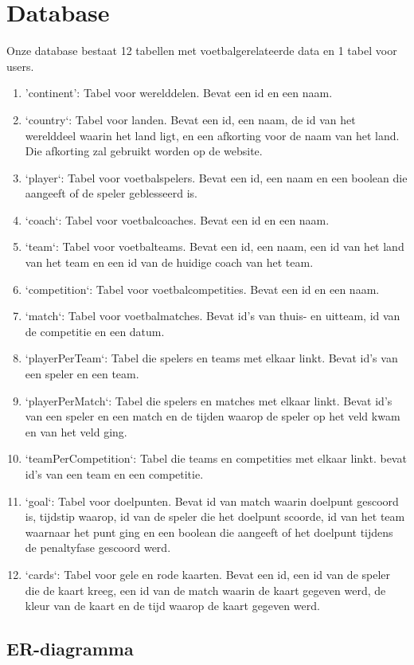 \documentclass[11pt, a4paper]{article}
\begin{document}
\section{Database}
Onze database bestaat 12 tabellen met voetbalgerelateerde data en 1 tabel voor users.
\begin{enumerate}
\item 'continent': Tabel voor werelddelen. Bevat een id en een naam.
\item `country`: Tabel voor landen. Bevat een id, een naam, de id van het werelddeel waarin het land ligt, en een afkorting voor de naam van het land. Die afkorting zal gebruikt worden op de website.
\item `player`: Tabel voor voetbalspelers. Bevat een id, een naam en een boolean die aangeeft of de speler geblesseerd is.
\item `coach`: Tabel voor voetbalcoaches. Bevat een id en een naam.
\item `team`: Tabel voor voetbalteams. Bevat een id, een naam, een id van het land van het team en een id van de huidige coach van het team.
\item `competition`: Tabel voor voetbalcompetities. Bevat een id en een naam.
\item `match`: Tabel voor voetbalmatches. Bevat id's van thuis- en uitteam, id van de competitie en een datum.
\item `playerPerTeam`: Tabel die spelers en teams met elkaar linkt. Bevat id's van een speler en een team.
\item `playerPerMatch`: Tabel die spelers en matches met elkaar linkt. Bevat id's van een speler en een match en de tijden waarop de speler op het veld kwam en van het veld ging.
\item `teamPerCompetition`: Tabel die teams en competities met elkaar linkt. bevat id's van een team en een competitie.
\item `goal`: Tabel voor doelpunten. Bevat id van match waarin doelpunt gescoord is, tijdstip waarop, id van de speler die het doelpunt scoorde, id van het team waarnaar het punt ging en een boolean die aangeeft of het doelpunt tijdens de penaltyfase gescoord werd.
\item `cards`: Tabel voor gele en rode kaarten. Bevat een id,	een id van de speler die de kaart kreeg, een id van de match waarin de kaart gegeven werd, de kleur van de kaart en de tijd waarop de kaart gegeven werd.
\end{enumerate}

\subsection{ER-diagramma}
\end{document}
